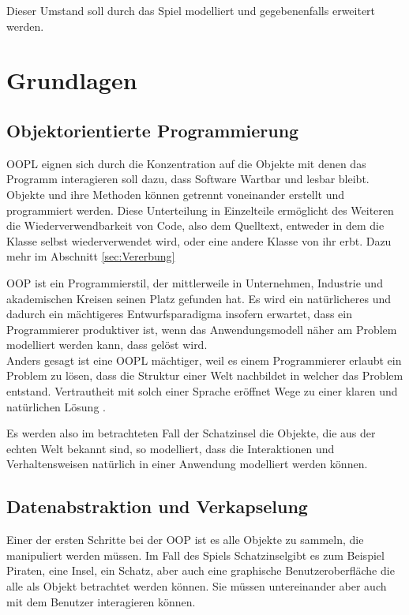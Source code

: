 \documentclass[
	12pt, %
	a4paper,
	listof=totoc, %
	bibliography=totoc, %
	numbers=noenddot, %
	ngerman, %
	headsepline, %
	oneside %
	]{scrbook} %
\begin{document}
Dieser Umstand soll durch das Spiel modelliert und gegebenenfalls erweitert werden.

\chapter{Grundlagen}\label{sec:Grundlagen}
\section{Objektorientierte Programmierung}
\gls{OOPL} eignen sich durch die Konzentration auf die Objekte mit denen das Programm interagieren soll dazu, dass Software Wartbar und lesbar bleibt. Objekte und ihre Methoden können getrennt voneinander erstellt und programmiert werden. Diese Unterteilung in Einzelteile ermöglicht des Weiteren die Wiederverwendbarkeit von Code, also dem Quelltext, entweder in dem die Klasse selbst wiederverwendet wird, oder eine andere Klasse von ihr erbt. Dazu mehr im Abschnitt \ref{sec:Vererbung}

\gls{OOP} ist ein Programmierstil, der mittlerweile in Unternehmen, Industrie und akademischen Kreisen seinen Platz gefunden hat. Es wird ein natürlicheres und dadurch ein mächtigeres Entwurfsparadigma insofern erwartet, dass ein Programmierer produktiver ist, wenn das Anwendungsmodell näher am Problem modelliert werden kann, dass gelöst wird.\\
Anders gesagt ist eine \gls{OOPL} mächtiger, weil es einem Programmierer erlaubt ein Problem zu lösen, dass die Struktur einer Welt nachbildet in welcher das Problem entstand. Vertrautheit mit solch einer Sprache eröffnet Wege zu einer klaren und natürlichen Lösung \cite{OOPL}.

Es werden also im betrachteten Fall der Schatzinsel die Objekte, die aus der echten Welt bekannt sind, so modelliert, dass die Interaktionen und Verhaltensweisen natürlich in einer Anwendung modelliert werden können.

\section{Datenabstraktion und Verkapselung}
Einer der ersten Schritte bei der \gls{OOP} ist es alle Objekte zu sammeln, die manipuliert werden müssen. Im Fall des Spiels \glqq Schatzinsel\grqq \hspace{0.1cm}gibt es zum Beispiel Piraten, eine Insel, ein Schatz, aber auch eine graphische Benutzeroberfläche die alle als Objekt betrachtet werden können. Sie müssen untereinander aber auch mit dem Benutzer interagieren können.
\end{document}
